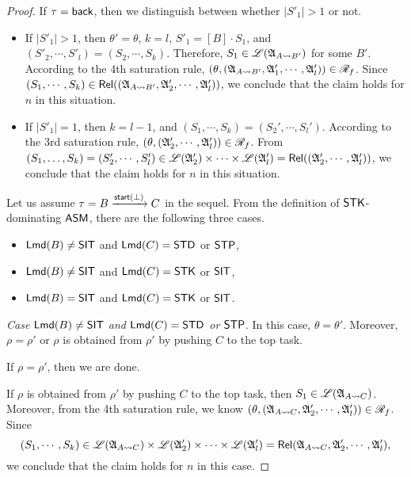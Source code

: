 \begin{proof}
If $\tau = {\mathsf{back} }$, then we distinguish between whether $|S'_1| > 1$ or not. 
\begin{itemize}
\item If $|S'_1| > 1$, then $\theta' = \theta$, $k=l$, $S'_1 = [B] \cdot S_1$, and $(S'_2, \cdots, S'_l) = (S_2, \cdots, S_k)$. 
Therefore, $S_1 \in {\mathscr{L} }({\mathfrak{A} }_{A \rightsquigarrow B'})$ for some $B'$. According to the 4th saturation rule, $(\theta, ({\mathfrak{A} }_{A \rightsquigarrow B'}, {\mathfrak{A} }'_1, \cdots, {\mathfrak{A} }'_l)) \in \mathscr{R}_f$. Since $(S_1, \cdots, S_k) \in \mathsf{Rel}(({\mathfrak{A} }_{A \rightsquigarrow B'}, {\mathfrak{A} }'_2, \cdots, {\mathfrak{A} }'_l))$, we conclude that the claim holds for $n$ in this situation. 
%
\item If $|S'_1| = 1$, then $k = l - 1$, and $(S_1,\cdots,S_k) = (S_2',\cdots,S_l')$. According to the 3rd saturation rule, $(\theta, ({\mathfrak{A} }_2',\cdots,{\mathfrak{A} }_l')) \in \mathscr{R}_f$. From $(S_1,\dots,S_k) = (S'_2, \cdots, S'_l) \in {\mathscr{L} }({\mathfrak{A} }_2') \times \cdots \times {\mathscr{L} }({\mathfrak{A} }_l') = \mathsf{Rel}(({\mathfrak{A} }'_2, \cdots, {\mathfrak{A} }'_l))$, we conclude that the claim holds for $n$ in this situation. 
\end{itemize}


Let us assume $\tau = B \xrightarrow{{\mathsf{start} }(\bot)} C$ in the sequel. From the definition of ${\sf STK}$-dominating $\textsf{ASM}$, there are the following three cases. 
\begin{itemize}
\item ${\sf Lmd}(B) \neq {\sf SIT}$ and ${\sf Lmd}(C) = {\sf STD}$ or ${\sf STP}$, 
%
\item ${\sf Lmd}(B) \neq {\sf SIT}$ and ${\sf Lmd}(C) = {\sf STK}$ or ${\sf SIT}$, 
%
\item ${\sf Lmd}(B) = {\sf SIT}$ and ${\sf Lmd}(C) = {\sf STK}$ or ${\sf SIT}$. 
\end{itemize}

\smallskip

\noindent \emph{Case ${\sf Lmd}(B) \neq {\sf SIT}$ and ${\sf Lmd}(C) = {\sf STD}$ or ${\sf STP}$}. In this case, $\theta = \theta'$. Moreover, $\rho = \rho'$ or $\rho$ is obtained from $\rho'$ by pushing $C$ to the top task.

If $\rho = \rho'$, then we are done. 

If $\rho$ is obtained from $\rho'$ by pushing $C$ to the top task, then $S_1 \in {\mathscr{L} }({\mathfrak{A} }_{A \rightsquigarrow C})$. Moreover, from the 4th saturation rule, we know $(\theta, ({\mathfrak{A} }_{A \rightsquigarrow C}, {\mathfrak{A} }'_2, \cdots, {\mathfrak{A} }'_l)) \in \mathscr{R}_f$. 
Since 
$$(S_1, \cdots, S_k) \in {\mathscr{L} }({\mathfrak{A} }_{A \rightsquigarrow C}) \times {\mathscr{L} }({\mathfrak{A} }'_2) \times \cdots \times {\mathscr{L} }({\mathfrak{A} }'_l) = \mathsf{Rel}({\mathfrak{A} }_{A \rightsquigarrow C}, {\mathfrak{A} }'_2, \cdots, {\mathfrak{A} }'_l),$$ 
we conclude that the claim holds for $n$ in this case. 


\end{proof}
